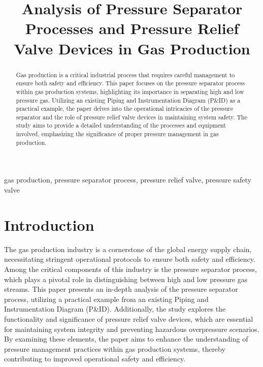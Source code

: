 \documentclass[conference]{IEEEtran}
\begin{document}
\title{Analysis of Pressure Separator Processes and Pressure Relief Valve Devices in Gas Production}

\author{
}


\maketitle

\begin{abstract}
    Gas production is a critical industrial process that requires careful management to ensure both safety and efficiency. This paper focuses on the pressure separator process within gas production systems, highlighting its importance in separating high and low pressure gas. Utilizing an existing Piping and Instrumentation Diagram (P\&ID) as a practical example, the paper delves into the operational intricacies of the pressure separator and the role of pressure relief valve devices in maintaining system safety. The study aims to provide a detailed understanding of the processes and equipment involved, emphasizing the significance of proper pressure management in gas production.
\end{abstract}

\begin{IEEEkeywords}
    gas production, pressure separator process, pressure relief valve, pressure safety valve
\end{IEEEkeywords}

\section{Introduction}

The gas production industry is a cornerstone of the global energy supply chain, necessitating stringent operational protocols to ensure both safety and efficiency. Among the critical components of this industry is the pressure separator process, which plays a pivotal role in distinguishing between high and low pressure gas streams. This paper presents an in-depth analysis of the pressure separator process, utilizing a practical example from an existing Piping and Instrumentation Diagram (P\&ID). Additionally, the study explores the functionality and significance of pressure relief valve devices, which are essential for maintaining system integrity and preventing hazardous overpressure scenarios. By examining these elements, the paper aims to enhance the understanding of pressure management practices within gas production systems, thereby contributing to improved operational safety and efficiency.
\end{document}
